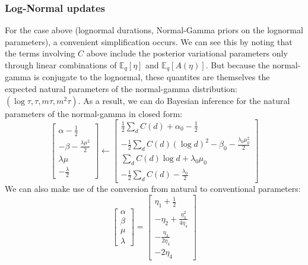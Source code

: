 \documentclass[11pt]{article}
\begin{document}
\subsubsection{Log-Normal updates}
For the case above (lognormal durations, Normal-Gamma priors on the lognormal parameters), a convenient simplification occurs. We can see this by noting that the terms involving $C$ above include the posterior variational parameters only through linear combinations of $\mathbb{E}_q[\eta]$ and $\mathbb{E}_q[A(\eta)]$. But because the normal-gamma is conjugate to the lognormal, these quantites are themselves the expected natural parameters of the normal-gamma distribution: $(\log \tau, \tau, m\tau, m^2\tau)$. As a result, we can do Bayesian inference for the natural parameters of the normal-gamma in closed form:
\begin{equation}
    \begin{bmatrix}
    \alpha - \frac{1}{2} \\
    -\beta - \frac{\lambda\mu^2}{2} \\
    \lambda\mu \\
    -\frac{\lambda}{2}
    \end{bmatrix}
    \leftarrow
    \begin{bmatrix}
    \frac{1}{2}\sum_d C(d) + \alpha_0 - \frac{1}{2} \\
    -\frac{1}{2} \sum_d C(d) (\log d)^2 -\beta_0 - \frac{\lambda_0\mu_0^2}{2} \\
    \sum_d C(d) \log d + \lambda_0\mu_0 \\
    -\frac{1}{2}\sum_d C(d) - \frac{\lambda_0}{2}
    \end{bmatrix}
\end{equation}
We can also make use of the conversion from natural to conventional parameters:
\begin{equation}
    \begin{bmatrix}
        \alpha \\
        \beta \\
        \mu \\
        \lambda
    \end{bmatrix} =
    \begin{bmatrix}
        \eta_1 + \frac{1}{2} \\
        -\eta_2 + \frac{\eta_3^2}{4\eta_4} \\
        -\frac{\eta_3}{2\eta_4} \\
        -2\eta_4
    \end{bmatrix}
\end{equation}
\end{document}
